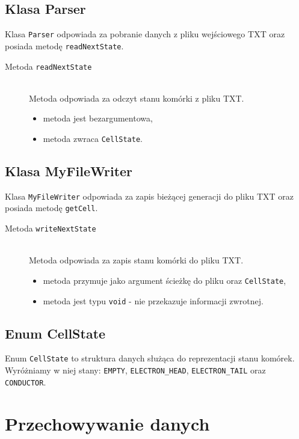 \documentclass[a4paper,12pt,oneside]{article}
\begin{document}
\subsection{Klasa Parser}

Klasa \verb+Parser+ odpowiada za pobranie danych z pliku wejściowego TXT oraz posiada metodę \verb+readNextState+.

\begin{description}
\item[Metoda \texttt{readNextState}] \hfill \\
Metoda odpowiada za odczyt stanu komórki z pliku TXT.
\begin{itemize}
\item metoda jest bezargumentowa,
\item metoda zwraca \verb+CellState+.
\end{itemize}

\end{description}

\subsection{Klasa MyFileWriter}

Klasa \verb+MyFileWriter+ odpowiada za zapis bieżącej generacji do pliku TXT oraz posiada metodę \verb+getCell+.

\begin{description}
\item[Metoda \texttt{writeNextState}] \hfill \\
Metoda odpowiada za zapis stanu komórki do pliku TXT.
\begin{itemize}
\item metoda przymuje jako argument ścieżkę do pliku oraz \verb+CellState+,
\item metoda jest typu \verb+void+ - nie przekazuje informacji zwrotnej.
\end{itemize}

\end{description}

\subsection{Enum CellState}

Enum \verb+CellState+ to struktura danych służąca do reprezentacji stanu komórek. Wyróżniamy w niej stany: \verb+EMPTY+, \verb+ELECTRON_HEAD+, \verb+ELECTRON_TAIL+ oraz \verb+CONDUCTOR+.

\section{Przechowywanie danych}
\end{document}
